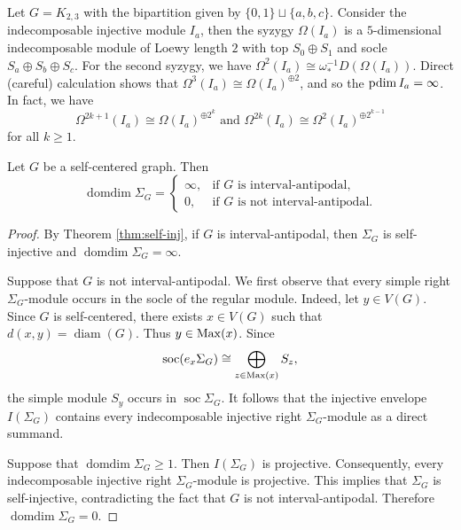 \documentclass[a4paper,leqno]{amsart}
\begin{document}
\begin{eg}\label{eg:idim K2,3}
Let $G=K_{2,3}$ with the bipartition given by $\{0,1\}\sqcup \{a,b,c\}$.
Consider the indecomposable injective module $I_a$, then the syzygy $\Omega(I_a)$ is a $5$-dimensional indecomposable module of Loewy length $2$ with top $S_0\oplus S_1$ and socle $S_{a}\oplus S_{b} \oplus S_{c}$.
For the second syzygy, we have $\Omega^2(I_a) \cong \omega_*^{-1}D(\Omega(I_a))$.  Direct (careful) calculation shows that $\Omega^3(I_a) \cong \Omega(I_a)^{\oplus 2}$, and so the $\operatorname{pdim} I_a = \infty$.  In fact, we have
\[
\Omega^{2k+1}(I_a) \cong \Omega(I_a)^{\oplus 2^k} \text{ and }\Omega^{2k}(I_a) \cong \Omega^{2}(I_a)^{\oplus 2^{k-1}}
\]
for all $k\ge 1$.
\end{eg}

\begin{prop}
Let $G$ be a self-centered graph. Then
\[
\operatorname{domdim} \Sigma_G=
\begin{cases}
\infty, & \text{if $G$ is interval-antipodal},\\
0,      & \text{if $G$ is not interval-antipodal}.
\end{cases}
\]
\end{prop}

\begin{proof}
By Theorem \ref{thm:self-inj}, if $G$ is interval-antipodal, then $\Sigma_G$ is self-injective and $\operatorname{domdim}\Sigma_G=\infty$.

Suppose that $G$ is not interval-antipodal. We first observe that every simple right $\Sigma_G$-module occurs in the socle of the regular module. Indeed, let $y\in V(G)$. Since $G$ is self-centered, there exists
$x\in V(G)$ such that $d(x,y)=\operatorname{diam}(G)$. Thus $y\in\operatorname{Max}(x)$. Since
\[\operatorname{soc}(e_x\Sigma_G)\cong \bigoplus_{z\in\operatorname{Max}(x)}S_z,\]
the simple module $S_y$ occurs in $\operatorname{soc}\Sigma_G$. It follows that the injective envelope $I(\Sigma_G)$ contains every indecomposable injective right $\Sigma_G$-module as a direct summand.

Suppose that $\operatorname{domdim}\Sigma_G\geq1$. Then $I(\Sigma_G)$ is projective. Consequently, every indecomposable injective right $\Sigma_G$-module is projective. This implies that $\Sigma_G$ is
self-injective, contradicting the fact that $G$ is not interval-antipodal. Therefore $\operatorname{domdim}\Sigma_G=0$.
\end{proof}


\end{document}
